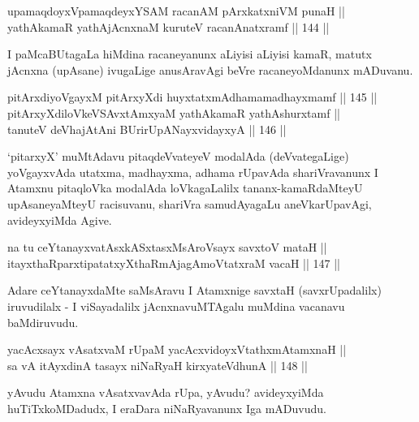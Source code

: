 \begin{shl}
upamaqdoyxVpamaqdeyxYSAM racanAM pArxkatxniVM punaH || \\
yathAkamaR yathAjAcnxnaM kuruteV racanAnatxramf \hfill || 144 ||  
\end{shl}

\begin{artha}
I paMcaBUtagaLa hiMdina racaneyanunx aLiyisi aLiyisi kamaR, matutx
jAcnxna (upAsane) ivugaLige anusAravAgi beVre racaneyoMdanunx mADuvanu.
\end{artha}


\begin{shl}
pitArxdiyoVgayxM pitArxyXdi huyxtatxmAdhamamadhayxmamf \hfill || 145 ||  \\
pitArxyXdiloVkeVSAvxtAmx\s yaM yathAkamaR yathAshurxtamf ||  \\
tanuteV deVhajAtAni BUrirUpANayxvidayxyA \hfill || 146 ||  
\end{shl}

\begin{artha}
`pitarxyX' muMtAdavu pitaqdeVvateyeV modalAda (deVvategaLige)
yoVgayxvAda utatxma, madhayxma, adhama rUpavAda shariVravanunx I
Atamxnu pitaqloVka modalAda loVkagaLalilx tananx-kamaRdaMteyU
upAsaneyaMteyU racisuvanu, shariVra samudAyagaLu aneVkarUpavAgi,
avideyxyiMda Agive.
\end{artha}

\begin{shl}
na tu ceYtanayxvatAsxkASxtasxMsAroV\s sayx savxtoV mataH || \\
itayxthaRparxtipatatxyXthaRmAjagAmoVtatxraM vacaH \hfill || 147 ||  
\end{shl}

\begin{artha}
Adare ceYtanayxdaMte saMsAravu I Atamxnige savxtaH (savxrUpadalilx)
iruvudilalx - I viSayadalilx jAcnxnavuMTAgalu muMdina vacanavu baMdiruvudu.
\end{artha}

\begin{shl}
yacAcxsayx vAsatxvaM rUpaM yacAcxvidoyxVtathxmAtamxnaH || \\
sa vA itAyxdinA tasayx niNaRyaH kirxyateV\s dhunA || 148 ||
\end{shl}

\begin{artha}
yAvudu Atamxna vAsatxvavAda rUpa, yAvudu? avideyxyiMda
huTiTxkoMDadudx, I eraDara niNaRyavanunx Iga mADuvudu.
\end{artha}


